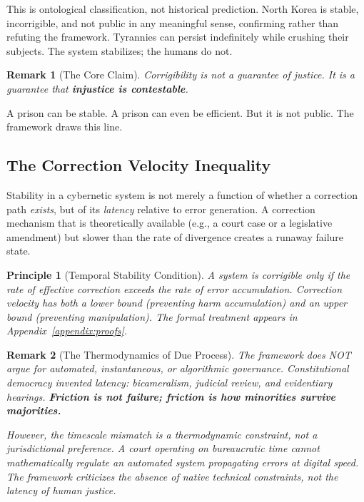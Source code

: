 \documentclass{article}
\newtheorem{remark}{Remark}
\newtheorem{principle}{Principle}
\begin{document}
This is ontological classification, not historical prediction. North Korea is stable, incorrigible, and not public in any meaningful sense, confirming rather than refuting the framework. Tyrannies can persist indefinitely while crushing their subjects. The system stabilizes; the humans do not.

\begin{remark}[The Core Claim]
Corrigibility is not a guarantee of justice. It is a guarantee that \textbf{injustice is contestable}.
\end{remark}

A prison can be stable. A prison can even be efficient. But it is not public. The framework draws this line.

\subsection{The Correction Velocity Inequality}
\label{subsec:velocity}

Stability in a cybernetic system is not merely a function of whether a correction path \textit{exists}, but of its \textit{latency} relative to error generation. A correction mechanism that is theoretically available (e.g., a court case or a legislative amendment) but slower than the rate of divergence creates a runaway failure state.

\begin{principle}[Temporal Stability Condition]
A system is corrigible only if the rate of effective correction exceeds the rate of error accumulation. Correction velocity has both a lower bound (preventing harm accumulation) and an upper bound (preventing manipulation). The formal treatment appears in Appendix~\ref{appendix:proofs}.
\end{principle}

\begin{remark}[The Thermodynamics of Due Process]
The framework does NOT argue for automated, instantaneous, or algorithmic governance. Constitutional democracy invented latency: bicameralism, judicial review, and evidentiary hearings. \textbf{Friction is not failure; friction is how minorities survive majorities.}

However, the timescale mismatch is a thermodynamic constraint, not a jurisdictional preference. A court operating on bureaucratic time cannot mathematically regulate an automated system propagating errors at digital speed. The framework criticizes the \textit{absence} of native technical constraints, not the \textit{latency} of human justice.
\end{remark}
\end{document}
